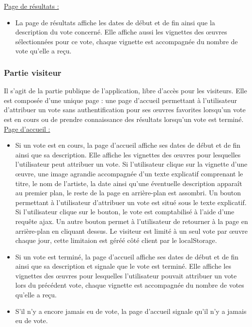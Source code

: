 \documentclass[a4paper]{article}
\begin{document}
\underline{Page de résultats :}\\
\begin{itemize}
\item La page de résultats affiche les dates de début et de fin ainsi que la description du vote concerné. Elle affiche aussi les vignettes des œuvres sélectionnées pour ce vote, chaque vignette est accompagnée du nombre de vote qu'elle a reçu.\\
\end{itemize}

\subsubsection{Partie visiteur}
Il s’agit de la partie publique de l’application, libre d’accès pour les visiteurs. Elle est composée d’une unique page : une page d’accueil permettant à l’utilisateur d'attribuer un vote sans authentification pour ses œuvres favorites lorsqu'un vote est en cours ou de prendre connaissance des résultats lorsqu'un vote est terminé.\\

\underline{Page d'accueil :}\\
\begin{itemize}
\item Si un vote est en cours, la page d'accueil affiche ses dates de début et de fin ainsi que sa description. Elle affiche les vignettes des œuvres pour lesquelles l'utilisateur peut attribuer un vote. Si l'utilisateur clique sur la vignette d'une œuvre, une image agrandie accompagnée d'un texte explicatif comprenant le titre, le nom de l'artiste, la date ainsi qu'une éventuelle description apparaît au premier plan, le reste de la page en arrière-plan est assombri. Un bouton permettant à l'utilisateur d'attribuer un vote est situé sous le texte explicatif. Si l'utilisateur clique sur le bouton, le vote est comptabilisé à l'aide d'une requête ajax. Un autre bouton permet à l'utilisateur de retourner à la page en arrière-plan en cliquant dessus. Le visiteur est limité à un seul vote par œuvre chaque jour, cette limitaion est géréé côté client par le localStorage.
\item Si un vote est terminé, la page d'accueil affiche ses dates de début et de fin ainsi que sa description et signale que le vote est terminé. Elle affiche les vignettes des œuvres pour lesquelles l'utilisateur pouvait attribuer un vote lors du précédent vote, chaque vignette est accompagnée du nombre de votes qu'elle a reçu.
\item S'il n'y a encore jamais eu de vote, la page d'accueil signale qu'il n'y a jamais eu de vote.\\
\end{itemize}
\end{document}
